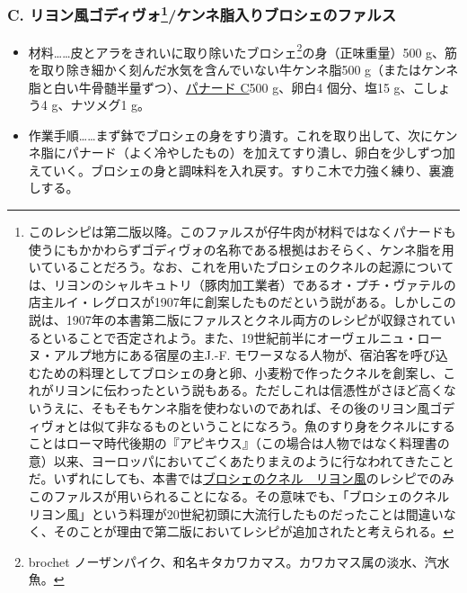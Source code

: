 \begin{recette}
{\subsubsection[C.
リヨン風ゴディヴォ/ケンネ脂入りブロシェのファルス]{\texorpdfstring{C.
リヨン風ゴディヴォ\footnote{このレシピは第二版以降。このファルスが仔牛肉が材料ではなくパナードも使うにもかかわらずゴディヴォの名称である根拠はおそらく、ケンネ脂を用いていることだろう。なお、これを用いたブロシェのクネルの起源については、リヨンのシャルキュトリ（豚肉加工業者）であるオ・プチ・ヴァテルの店主ルイ・レグロスが1907年に創案したものだという説がある。しかしこの説は、1907年の本書第二版にファルスとクネル両方のレシピが収録されているといることで否定されよう。また、19世紀前半にオーヴェルニュ・ローヌ・アルプ地方にある宿屋の主J.-F.
  モワーヌなる人物が、宿泊客を呼び込むための料理としてブロシェの身と卵、小麦粉で作ったクネルを創案し、これがリヨンに伝わったという説もある。ただしこれは信憑性がさほど高くないうえに、そもそもケンネ脂を使わないのであれば、その後のリヨン風ゴディヴォとは似て非なるものということになろう。魚のすり身をクネルにすることはローマ時代後期の『アピキウス』（この場合は人物ではなく料理書の意）以来、ヨーロッパにおいてごくあたりまえのように行なわれてきたことだ。いずれにしても、本書では\protect\hyperlink{quenelles-de-brochet-lyonnaise}{ブロシェのクネル　リヨン風}のレシピでのみこのファルスが用いられることになる。その意味でも、「ブロシェのクネル　リヨン風」という料理が20世紀初頭に大流行したものだったことは間違いなく、そのことが理由で第二版においてレシピが追加されたと考えられる。}/ケンネ脂入りブロシェのファルス}{C. リヨン風ゴディヴォ/ケンネ脂入りブロシェのファルス}}\label{godiveau-lyonnais}}



\begin{itemize}
\item
  材料\ldots{}\ldots{}皮とアラをきれいに取り除いたブロシェ\footnote{brochet
    ノーザンパイク、和名キタカワカマス。カワカマス属の淡水、汽水魚。}の身（正味重量）500
  g、筋を取り除き細かく刻んだ水気を含んでいない牛ケンネ脂500
  g（またはケンネ脂と白い牛骨髄半量ずつ）、\protect\hyperlink{panade-c}{パナード
  C}500 g、卵白4 個分、塩15 g、こしょう4 g、ナツメグ1 g。
\item
  作業手順\ldots{}\ldots{}まず鉢でブロシェの身をすり潰す。これを取り出して、次にケンネ脂にパナード（よく冷やしたもの）を加えてすり潰し、卵白を少しずつ加えていく。ブロシェの身と調味料を入れ戻す。すりこ木で力強く練り、裏漉しする。
\end{itemize}


\end{recette}
